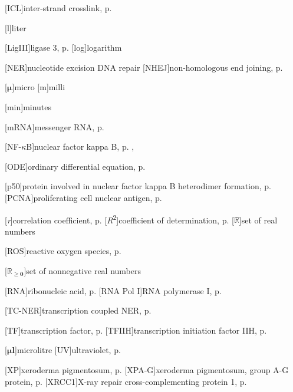 \begin{acronym}
[ICL]{inter-strand crosslink, p. \pageref{sec:intro_reg_repair}}





[l]{liter}

[LigIII]{ligase 3, p. \pageref{sec:NERmechanism}}
[log]{logarithm}

[NER]{nucleotide excision DNA repair}
[NHEJ]{non-homologous end joining, p. \pageref{sec:intro_reg_repair}}


[{$\boldsymbol{\mu}$}]{micro}
[m]{milli}


[min]{minutes}


[mRNA]{messenger RNA, p. \pageref{mRNA_0}}


[NF-$\kappa$B]{nuclear factor kappa B, p. \pageref{NFkB_2}, 
\pageref{NFkB_3}}



[ODE]{ordinary differential equation, p. \pageref{ODE}}



[p50]{protein involved in nuclear factor kappa B heterodimer formation, p. 
\pageref{p50}}
[PCNA]{proliferating cell nuclear antigen, p. \pageref{sec:NERmechanism}}


[\textit{r}]{correlation coefficient, p. \pageref{correlation_coefficient}}  %
[\textit{R}\textsuperscript{2}]{coefficient of determination, p. 
\pageref{coefficient_determination}}
[$ \boldsymbol{\mathds{R}} $]{set of real numbers}

[ROS]{reactive oxygen species, p. \pageref{sec:intro_reg_repair}}

[$ \boldsymbol{\mathds{R}_{\geq 0} } $]{set of nonnegative real numbers}


[RNA]{ribonucleic acid, p. \pageref{sec:intro_reg_repair}}
[RNA Pol I]{RNA polymerase I, p. \pageref{sec:RNA_pol}}

[TC-NER]{transcription coupled NER, p. \pageref{sec:NERmechanism}}

[TF]{transcription factor, p. \pageref{TF}}
[TFIIH]{transcription initiation factor IIH, p. \pageref{sec:NERmechanism}}



[$ \boldsymbol{ \mu \text{l} } $]{microlitre}
[UV]{ultraviolet, p. \pageref{sec:intro_reg_repair}}

[XP]{xeroderma pigmentosum, p. \pageref{sec:NERmechanism}}
[XPA-G]{xeroderma pigmentosum, group A-G protein, p. \pageref{sec:NERmechanism}}
[XRCC1]{X-ray repair cross-complementing protein 1, p. \pageref{sec:NERmechanism}}

\end{acronym}